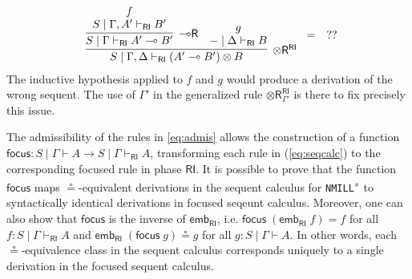 \documentclass[submission,copyright,creativecommons]{eptcs}
\theoremstyle{definition}
\newcommand{\tr}{\otimes \mathsf{R}}
\newcommand{\lright}{{\multimap}\mathsf{R}}
\newcommand{\ot}{\otimes}
\newcommand{\lolli}{\multimap}
\newcommand{\RI}{\mathsf{RI}}
\newcommand{\proofbox}[1]{\begin{tabular}{l} #1 \end{tabular}}
\newcommand{\NMILL}{\texttt{NMILL}}
\newcommand{\SkNMILL}{\NMILL\textsuperscript{\textit{s}}}
\begin{document}
\begin{displaymath}
  \proofbox{
    \infer[\tr^{\RI}]{S \mid \Gamma , \Delta \vdash_{\RI} (A' \lolli B') \ot B}{
    \infer[\lright]{S \mid \Gamma \vdash_{\RI} A' \lolli B'}{
      \deduce{S \mid \Gamma , A' \vdash_{\RI} B'}{f}
    }
    &
    \deduce{- \mid \Delta \vdash_{\RI} B}{g}
    }
    } = \quad ??
\end{displaymath}
The inductive hypothesis applied to $f$ and $g$ would produce a derivation of the wrong sequent. The use of $\Gamma'$ in the generalized rule $\tr_{\Gamma'}^{\RI}$ is there to fix precisely this issue.

The admissibility of the rules in \ref{eq:admis} allows the construction of a function $\mathsf{focus} : S \mid \Gamma \vdash A \to S \mid \Gamma \vdash_\RI A$, transforming each rule in (\ref{eq:seqcalc}) to the corresponding focused rule in phase $\RI$.
It is possible to prove that the function $\mathsf{focus}$ maps  $\circeq$-equivalent derivations in the sequent calculus for \SkNMILL\ to syntactically identical derivations in focused seqeunt calculus. Moreover, one can also show that $\mathsf{focus}$ is the inverse of $\mathsf{emb}_\RI$, i.e. $\mathsf{focus}\;(\mathsf{emb}_\RI \;f) = f$ for all $f : S \mid \Gamma \vdash_\RI A$ and $\mathsf{emb}_\RI\;(\mathsf{focus}\;g) \circeq g$ for all $g : S \mid \Gamma \vdash A$. In other words, each $\circeq$-equivalence class in the sequent calculus corresponds uniquely to a single derivation in the focused sequent calculus.
\end{document}
